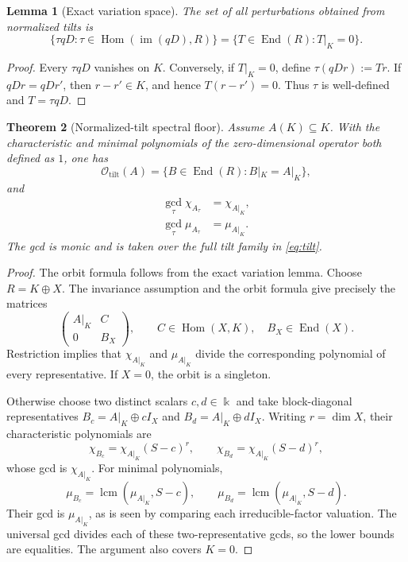 \documentclass[11pt]{amsart}
\newtheorem{theorem}{Theorem}[section]
\newtheorem{lemma}[theorem]{Lemma}
\theoremstyle{definition}
\newcommand{\kk}{\Bbbk}
\newcommand{\im}{\operatorname{im}}
\newcommand{\End}{\operatorname{End}}
\newcommand{\Hom}{\operatorname{Hom}}
\begin{document}
\begin{lemma}[Exact variation space]
The set of all perturbations obtained from normalized tilts is
\begin{equation}
\{\tau qD:\tau\in\Hom(\im(qD),R)\}
=\{T\in\End(R):T|_K=0\}.
\label{eq:variation}
\end{equation}
\end{lemma}

\begin{proof}
Every \(\tau qD\) vanishes on \(K\). Conversely, if \(T|_K=0\), define \(\tau(qD r):=Tr\).
If \(qDr=qDr'\), then \(r-r'\in K\), and hence \(T(r-r')=0\). Thus \(\tau\) is well-defined
and \(T=\tau qD\).
\end{proof}

\begin{theorem}[Normalized-tilt spectral floor]
Assume \(A(K)\subseteq K\). With the characteristic and minimal polynomials of the
zero-dimensional operator both defined as \(1\), one has
\[
\mathcal O_{\mathrm{tilt}}(A)=
\{B\in\End(R):B|_K=A|_K\},
\]
and
\begin{align}
\gcd_\tau\chi_{A_\tau}&=\chi_{A|_K},\label{eq:charfloor}\\
\gcd_\tau\mu_{A_\tau}&=\mu_{A|_K}.\label{eq:minfloor}
\end{align}
The gcd is monic and is taken over the full tilt family in \eqref{eq:tilt}.
\label{thm:floor}
\end{theorem}
\begin{proof}
The orbit formula follows from the exact variation lemma. Choose \(R=K\oplus X\).
The invariance assumption and the orbit formula give precisely the matrices
\[
\begin{pmatrix} A|_K&C\\0&B_X\end{pmatrix},
\qquad C\in\Hom(X,K),\quad B_X\in\End(X).
\]
Restriction implies that \(\chi_{A|_K}\) and \(\mu_{A|_K}\) divide the corresponding
polynomial of every representative. If \(X=0\), the orbit is a singleton.

Otherwise choose two distinct scalars \(c,d\in\kk\) and take block-diagonal
representatives \(B_c=A|_K\oplus cI_X\) and \(B_d=A|_K\oplus dI_X\).
Writing \(r=\dim X\), their characteristic polynomials are
\[
\chi_{B_c}=\chi_{A|_K}(S-c)^r,\qquad
\chi_{B_d}=\chi_{A|_K}(S-d)^r,
\]
whose gcd is \(\chi_{A|_K}\). For minimal polynomials,
\[
\mu_{B_c}=\operatorname{lcm}(\mu_{A|_K},S-c),\qquad
\mu_{B_d}=\operatorname{lcm}(\mu_{A|_K},S-d).
\]
Their gcd is \(\mu_{A|_K}\), as is seen by comparing each irreducible-factor
valuation. The universal gcd divides each of these two-representative gcds,
so the lower bounds are equalities. The argument also covers \(K=0\).
\end{proof}
\end{document}
